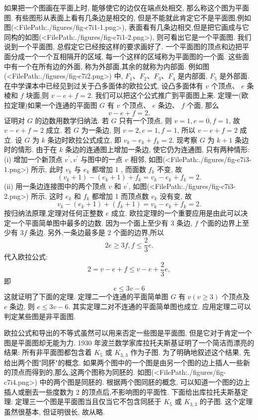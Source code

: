 
如果把一个图画在平面上时, 能够使它的边仅在端点处相交, 那么称这个图为平面图.
有些图形从表面上看有几条边是相交的, 但是不能就此肯定它不是平面图,例如图(<FilePath:./figures/fig-c7i1-1.png>), 表面看有几条边相交,但是把它画成与它同构的如图(<FilePath:./figures/fig-c7i1-2.png>), 则可看出它是一个平面图.
我们说到一个平面图, 总假定它已经按这样的要求画好了.
一个平面图的顶点和边把平面分成一个一个互相隔开的区域, 每一个这样的区域称为平面图的一个面.
这些面中有一个在所有边的外面, 称为外部面,其余的就称为内部面.
例如图(<FilePath:./figures/fig-c7i2.png>) 中, $F_1 、 F_2 、 F_3 、 F_4$ 是内部面, $F_5$ 是外部面.
在中学课本中已经见到过关于凸多面体的欧拉公式, 设凸多面体有 $v$ 个顶点、 $e$ 条棱和 $f$ 块面,则 $v-e+f=2$. 我们可以把这个公式推广到平面图上来.
定理一(欧拉定理)如果一个连通的平面图 $G$ 有 $v$ 个顶点、 $e$ 条边、 $f$ 个面, 那么
$$
v-e+f=2 .
$$
证明对 $G$ 的边数用数学归纳法.
若 $G$ 只有一个顶点, 则 $v=1, e=0, f=1$, 故 $v-e+f=2$ 成立.
若 $G$ 为一条边, 则 $v=2, e=1, f=1$, 所以 $v-e+f=2$ 成立.
设 $G$ 为 $k$ 条边时欧拉公式成立, 即 $v_k-e_k+f_k=2$. 现考察 $G$ 为 $k+1$ 条边时的情形.
由于在 $k$ 条边的连通图上增加一条边, 使它仍为连通图, 只有两种情形:
(i) 增加一个新顶点 $v^{\prime}, v^{\prime}$ 与图中的一点 $v$ 相邻, 如图(<FilePath:./figures/fig-c7i3-1.png>) 所示, 此时 $v_k$ 与 $e_k$ 都增加 1 , 而面数 $f_k$ 不变, 故
$$
\left(v_k+1\right)-\left(e_k+1\right)+f_k=v_k-e_k+f_k=2 .
$$
(ii) 用一条边连接图中的两个顶点 $v$ 和 $v^{\prime}$, 如图(<FilePath:./figures/fig-c7i3-2.png>) 所示, 这时 $e_k$ 和 $f_k$ 都增加 1 而顶点数 $v_k$ 没有变, 故
$$
v_k-\left(e_k+1\right)+\left(f_k+1\right)=v_k-e_k+f_k=2 .
$$
按归纳法原理,定理对任何正整数 $e$ 成立.
欧拉定理的一个重要应用是由此可以决定一个平面简单图中最多的边数.
因为一个面上至少有 3 条边, $f$ 个面的边界上至少有 $3 f$ 条边.
另外,一条边最多是 2 个面的边界,所以
$$
2 e \geqslant 3 f, f \leqslant \frac{2}{3} e .
$$
代入欧拉公式:
$$
2=v-e+f \leqslant v-e+\frac{2}{3} e,
$$
即
$$
e \leqslant 3 v-6
$$
这就证明了下面的定理.
定理二一个连通的平面简单图 $G$ 有 $v(v \geqslant 3)$ 个顶点及 $e$ 条边, 则 $e \leqslant 3 v-6$.
其实定理二对不连通的平面简单图也成立.
应用定理二可以判定某些图是非平面图.



欧拉公式和导出的不等式虽然可以用来否定一些图是平面图, 但是它对于肯定一个图是平面图却无能为力.
1930 年波兰数学家库拉托夫斯基证明了一个简洁而漂亮的结果: 所有非平面图都包含着 $K_5$ 或 $K_{3,}{ }_3$ 作为子图.
为了明确地叙述这个结果, 先给出两个图"同肧"的概念.
如果两个图中的一个图是由另一个图的边上插人一些新的顶点而得到的,那么,这两个图称为同胚的.
如图(<FilePath:./figures/fig-c7i4.png>) 中的两个图是同胚的.
根据两个图同胚的概念, 可以知道一个图的边上插人或删去一些度数为 2 的顶点后,不影响图的平面性.
下面给出库拉托夫斯基定理:
定理三一个图是平面图当且仅当它不包含同胚于 $K_5$ 或 $K_{3,3}$ 的子图.
这个定理虽然很基本, 但证明很长, 故从略.



